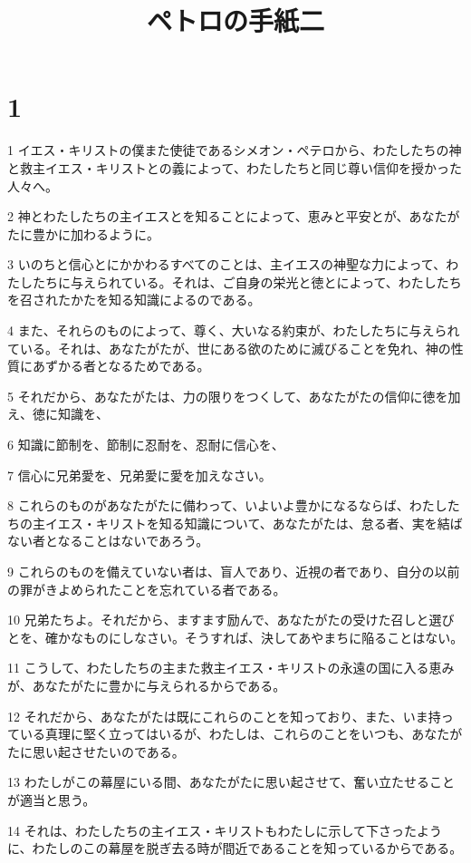 

\title{ペトロの手紙二}


\chapter{1}

\par 1 イエス・キリストの僕また使徒であるシメオン・ペテロから、わたしたちの神と救主イエス・キリストとの義によって、わたしたちと同じ尊い信仰を授かった人々へ。
\par 2 神とわたしたちの主イエスとを知ることによって、恵みと平安とが、あなたがたに豊かに加わるように。
\par 3 いのちと信心とにかかわるすべてのことは、主イエスの神聖な力によって、わたしたちに与えられている。それは、ご自身の栄光と徳とによって、わたしたちを召されたかたを知る知識によるのである。
\par 4 また、それらのものによって、尊く、大いなる約束が、わたしたちに与えられている。それは、あなたがたが、世にある欲のために滅びることを免れ、神の性質にあずかる者となるためである。
\par 5 それだから、あなたがたは、力の限りをつくして、あなたがたの信仰に徳を加え、徳に知識を、
\par 6 知識に節制を、節制に忍耐を、忍耐に信心を、
\par 7 信心に兄弟愛を、兄弟愛に愛を加えなさい。
\par 8 これらのものがあなたがたに備わって、いよいよ豊かになるならば、わたしたちの主イエス・キリストを知る知識について、あなたがたは、怠る者、実を結ばない者となることはないであろう。
\par 9 これらのものを備えていない者は、盲人であり、近視の者であり、自分の以前の罪がきよめられたことを忘れている者である。
\par 10 兄弟たちよ。それだから、ますます励んで、あなたがたの受けた召しと選びとを、確かなものにしなさい。そうすれば、決してあやまちに陥ることはない。
\par 11 こうして、わたしたちの主また救主イエス・キリストの永遠の国に入る恵みが、あなたがたに豊かに与えられるからである。
\par 12 それだから、あなたがたは既にこれらのことを知っており、また、いま持っている真理に堅く立ってはいるが、わたしは、これらのことをいつも、あなたがたに思い起させたいのである。
\par 13 わたしがこの幕屋にいる間、あなたがたに思い起させて、奮い立たせることが適当と思う。
\par 14 それは、わたしたちの主イエス・キリストもわたしに示して下さったように、わたしのこの幕屋を脱ぎ去る時が間近であることを知っているからである。
